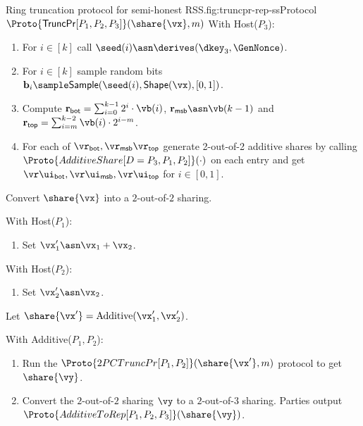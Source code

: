 \begin{Boxfig}{Ring truncation protocol for semi-honest
RSS.}{fig:truncpr-rep-ss}{Protocol $\Proto{\mathsf{TruncPr}{[P_1, P_2, P_3]}}(\share{\vx}, m)$}
With Host($P_3$):
  \begin{enumerate}
    \item For $i \in [k]$ call $\seed(i) \asn \derives(\dkey_3, \GenNonce)$.
    \item For $i \in [k]$ sample random bits $\mathbf{b}_i \sample \mathsf{Sample}(\seed(i), \mathsf{Shape}(\vx), [0,1])$.
    \item Compute
    $\mathbf{r}_{\mathsf{bot}} = \sum_{i=0}^{k-1}2^i \cdot \vb(i)$,
    $\mathbf{r}_{\mathsf{msb}} \asn \vb(k-1)$ and
    $\mathbf{r}_{\mathsf{top}} = \sum_{i=m}^{k-2} \vb(i) \cdot 2^{i-m}$.
    \item For each of $\vr_{\mathsf{bot}}, \vr_{\mathsf{msb}} \vr_{\mathsf{top}}$
    generate 2-out-of-2 additive shares by calling $\Proto{AdditiveShare[D=P_3, P_1, P_2]}(\cdot)$
    on each entry and get $
    \vr\ui_{\mathsf{bot}}, \vr\ui_{\mathsf{msb}}, \vr\ui_{\mathsf{top}}$ for $i \in [0,1]$.
 \end{enumerate}
\item Convert $\share{\vx}$ into a $2$-out-of-$2$ sharing.

With Host($P_1$):
\begin{enumerate}
  \item Set $\vx'_1 \asn \vx_1 + \vx_2$.
\end{enumerate}

With Host($P_2$):
\begin{enumerate}
    \item Set $\vx'_2 \asn \vx_2$.
\end{enumerate}
Let $\share{\vx'} = \text{Additive}(\vx'_1, \vx'_2)$.

With Additive($P_1, P_2$):
\begin{enumerate}
   \item Run the $\Proto{2PCTruncPr[P_1, P_2]}(\share{\vx'}, m)$ protocol to get $\share{\vy}$.
  \item Convert the $2$-out-of-$2$ sharing $\vy$ to a $2$-out-of-$3$
 sharing. Parties output $\Proto{AdditiveToRep[P_1, P_2, P_3]}(\share{\vy})$.
\end{enumerate}

\end{Boxfig}

